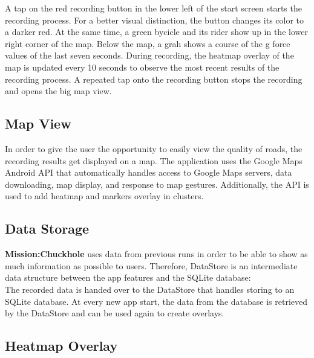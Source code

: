 \documentclass[10pt,a4paper]{article} %
\begin{document}
    	A tap on the red recording button in the lower left of the start screen starts the recording process.
    	For a better visual distinction, the button changes its color to a darker red.
	At the same time, a green bycicle and its rider show up in the lower right corner of the map.
	Below the map, a grah shows a course of the g force values of the last seven seconds.
	During recording, the heatmap overlay of the map is updated every 10 seconds to observe the most recent results of the recording process.
	A repeated tap onto the recording button stops the recording and opens the big map view.
	
    
    	
    	
    
    
    



    \subsection{Map View}
    	In order to give the user the opportunity to easily view the quality of roads, the recording results get displayed on a map. The application uses the Google Maps Android API that automatically handles access to Google Maps servers, data downloading, map display, and response to map gestures. 
    Additionally, the API is used to add heatmap and markers overlay in clusters.


    \subsection{Data Storage}
    \textbf{Mission:Chuckhole} uses data from previous runs in order to be able to show as much information as possible to users.
    	Therefore, DataStore is an intermediate data structure between the app features and the SQLite database:\\
	The recorded data is handed over to the DataStore that handles storing to an SQLite database.
	At every new app start, the data from the database is retrieved by the DataStore and can be used again to create overlays.    

    
    \subsection{Heatmap Overlay}
    
\end{document}
